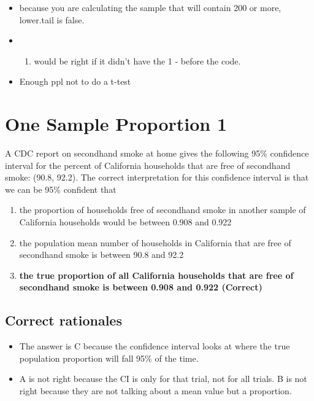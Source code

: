 \documentclass[letterpaper,9pt,twoside,printwatermark=false]{pinp}
\providecommand{\tightlist}{%
  \setlength{\itemsep}{0pt}\setlength{\parskip}{0pt}}
\begin{document}
\begin{itemize}
\item
  because you are calculating the sample that will contain 200 or more,
  lower.tail is false.
\item
  \begin{enumerate}
  \def\labelenumi{\Alph{enumi})}
  \setcounter{enumi}{4}
  \tightlist
  \item
    would be right if it didn't have the 1 - before the code.
  \end{enumerate}
\item
  Enough ppl not to do a t-test
\end{itemize}

\hypertarget{one-sample-proportion-1}{%
\section{One Sample Proportion 1}\label{one-sample-proportion-1}}

A CDC report on secondhand smoke at home gives the following 95\%
confidence interval for the percent of California households that are
free of secondhand smoke: (90.8, 92.2). The correct interpretation for
this confidence interval is that we can be 95\% confident that

\begin{enumerate}
\def\labelenumi{\alph{enumi}.}
\tightlist
\item
  the proportion of households free of secondhand smoke in another
  sample of California households would be between 0.908 and 0.922
\item
  the population mean number of households in California that are free
  of secondhand smoke is between 90.8 and 92.2
\item
  \textbf{the true proportion of all California households that are free
  of secondhand smoke is between 0.908 and 0.922 (Correct)}
\end{enumerate}

\hypertarget{correct-rationales-13}{%
\subsection{Correct rationales}\label{correct-rationales-13}}

\begin{itemize}
\tightlist
\item
  The answer is C because the confidence interval looks at where the
  true population proportion will fall 95\% of the time.
\item
  A is not right because the CI is only for that trial, not for all
  trials. B is not right because they are not talking about a mean value
  but a proportion.
\end{itemize}
\end{document}
